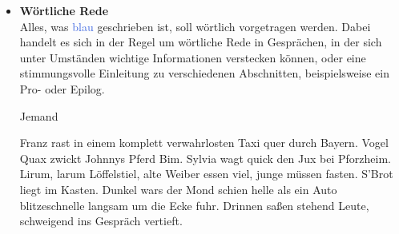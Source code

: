 \begin{itemize}
  \begin{probe-box}{Lesen}{-10}
  Bei erfolgreicher Probe geschieht, was hier steht. Oder wie genau der Versuch der Spieler in die Hose gehen kann. Kreativität ist natürlich auch gerne gesehen.
  \end{probe-box}
  \vspace{-5pt}


  \item \textcolor{BlueBoxFrame}{\textbf{Wörtliche Rede}} \\
  Alles, was \textcolor{RoyalBlue}{blau} geschrieben ist, soll wörtlich vorgetragen werden. Dabei handelt es sich in der Regel
  um wörtliche Rede in Gesprächen, in der sich unter Umständen wichtige Informationen verstecken können, oder eine
  stimmungsvolle Einleitung zu verschiedenen Abschnitten, beispielsweise ein Pro- oder Epilog.

  \begin{say-box}{Jemand}

  Franz rast in einem komplett verwahrlosten Taxi quer durch Bayern. Vogel Quax zwickt Johnnys Pferd Bim. Sylvia wagt quick den Jux bei Pforzheim.
  Lirum, larum Löffelstiel, alte Weiber essen viel, junge müssen fasten. S'Brot liegt im Kasten. Dunkel wars der Mond schien helle als ein Auto
  blitzeschnelle langsam um die Ecke fuhr. Drinnen saßen stehend Leute, schweigend ins Gespräch vertieft.

  \end{say-box}
  \vspace{-5pt}

\end{itemize}
